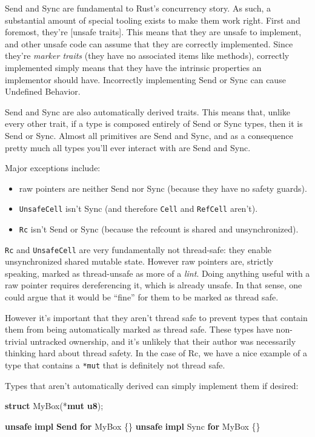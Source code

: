 \documentclass[a4paper,]{book}
\newenvironment{Shaded}{\begin{snugshade}}{\end{snugshade}}
\newcommand{\KeywordTok}[1]{\textcolor[rgb]{0.13,0.29,0.53}{\textbf{{#1}}}}
\newcommand{\NormalTok}[1]{{#1}}
\begin{document}
Send and Sync are fundamental to Rust's concurrency story. As such, a
substantial amount of special tooling exists to make them work right.
First and foremost, they're {[}unsafe traits{]}. This means that they
are unsafe to implement, and other unsafe code can assume that they are
correctly implemented. Since they're \emph{marker traits} (they have no
associated items like methods), correctly implemented simply means that
they have the intrinsic properties an implementor should have.
Incorrectly implementing Send or Sync can cause Undefined Behavior.

Send and Sync are also automatically derived traits. This means that,
unlike every other trait, if a type is composed entirely of Send or Sync
types, then it is Send or Sync. Almost all primitives are Send and Sync,
and as a consequence pretty much all types you'll ever interact with are
Send and Sync.

Major exceptions include:

\begin{itemize}
\itemsep1pt\parskip0pt
\item
  raw pointers are neither Send nor Sync (because they have no safety
  guards).
\item
  \texttt{UnsafeCell} isn't Sync (and therefore \texttt{Cell} and
  \texttt{RefCell} aren't).
\item
  \texttt{Rc} isn't Send or Sync (because the refcount is shared and
  unsynchronized).
\end{itemize}

\texttt{Rc} and \texttt{UnsafeCell} are very fundamentally not
thread-safe: they enable unsynchronized shared mutable state. However
raw pointers are, strictly speaking, marked as thread-unsafe as more of
a \emph{lint}. Doing anything useful with a raw pointer requires
dereferencing it, which is already unsafe. In that sense, one could
argue that it would be ``fine'' for them to be marked as thread safe.

However it's important that they aren't thread safe to prevent types
that contain them from being automatically marked as thread safe. These
types have non-trivial untracked ownership, and it's unlikely that their
author was necessarily thinking hard about thread safety. In the case of
Rc, we have a nice example of a type that contains a \texttt{*mut} that
is definitely not thread safe.

Types that aren't automatically derived can simply implement them if
desired:

\begin{Shaded}
\begin{Highlighting}[]
\KeywordTok{struct} \NormalTok{MyBox(*}\KeywordTok{mut} \KeywordTok{u8}\NormalTok{);}

\KeywordTok{unsafe} \KeywordTok{impl} \KeywordTok{Send} \KeywordTok{for} \NormalTok{MyBox \{\}}
\KeywordTok{unsafe} \KeywordTok{impl} \NormalTok{Sync }\KeywordTok{for} \NormalTok{MyBox \{\}}
\end{Highlighting}
\end{Shaded}
\end{document}
